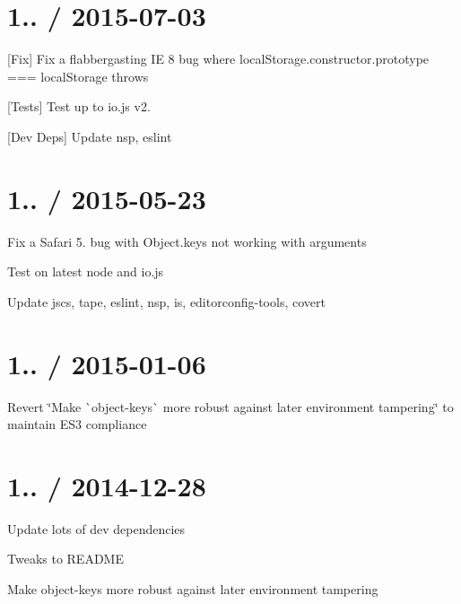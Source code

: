 \section*{1.. / 2015-\/07-\/03 }


\begin{DoxyItemize}
\item \mbox{[}Fix\mbox{]} Fix a flabbergasting IE 8 bug where {\ttfamily local\+Storage.\+constructor.\+prototype === local\+Storage} throws
\item \mbox{[}Tests\mbox{]} Test up to {\ttfamily io.\+js} {\ttfamily v2.}
\item \mbox{[}Dev Deps\mbox{]} Update {\ttfamily nsp}, {\ttfamily eslint}
\end{DoxyItemize}

\section*{1.. / 2015-\/05-\/23 }


\begin{DoxyItemize}
\item Fix a Safari 5. bug with {\ttfamily Object.\+keys} not working with {\ttfamily arguments}
\item Test on latest {\ttfamily node} and {\ttfamily io.\+js}
\item Update {\ttfamily jscs}, {\ttfamily tape}, {\ttfamily eslint}, {\ttfamily nsp}, {\ttfamily is}, {\ttfamily editorconfig-\/tools}, {\ttfamily covert}
\end{DoxyItemize}

\section*{1.. / 2015-\/01-\/06 }


\begin{DoxyItemize}
\item Revert \char`\"{}\+Make \`{}object-\/keys\`{} more robust against later environment tampering\char`\"{} to maintain E\+S3 compliance
\end{DoxyItemize}

\section*{1.. / 2014-\/12-\/28 }


\begin{DoxyItemize}
\item Update lots of dev dependencies
\item Tweaks to R\+E\+A\+D\+ME
\item Make {\ttfamily object-\/keys} more robust against later environment tampering
\end{DoxyItemize}

